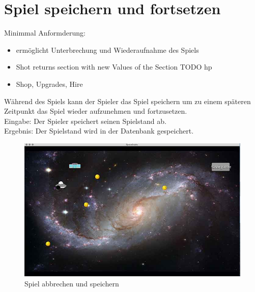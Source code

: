 \documentclass[12pt]{article}
\begin{document}
\newpage
\section{Spiel speichern und fortsetzen}
Minimmal Anformderung:
\begin{itemize}
\item  ermöglicht Unterbrechung und Wiederaufnahme des Spiels
\item Shot returns section with new Values of the Section TODO hp
\item Shop, Upgrades, Hire
\end{itemize}
Während des Spiels kann der Spieler das Spiel speichern um zu einem späteren Zeitpunkt das Spiel wieder aufzunehmen und fortzusetzen.\\
Eingabe: Der Spieler speichert seinen Spielstand ab.\\
Ergebnis: Der Spielstand wird in der Datenbank gespeichert.\\
\begin{figure}[htp]
	\centering
	\includegraphics[scale=0.6]{TestProtocolBilder/continue1@0,25x.jpg}
	\caption{Spiel abbrechen und speichern}
\end{figure}
\end{document}
